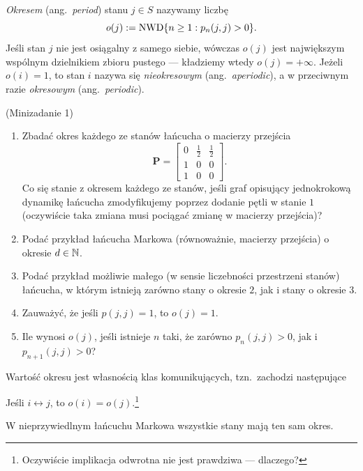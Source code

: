\documentclass[dvipsnames]{book}
\begin{document}
\begin{definicja}
\emph{Okresem} (ang.\ \emph{period}) stanu $j \in S$ nazywamy liczbę
\[
  o(j) := \mathrm{NWD}\{n \geq 1 : p_n(j,j) > 0\}.
\]
Jeśli stan $j$ nie jest osiągalny z samego siebie, wówczas $o(j)$ jest
największym wspólnym dzielnikiem zbioru pustego --- kładziemy wtedy
$o(j) = +\infty$. Jeżeli $o(i) = 1$, to stan $i$ nazywa się
\emph{nieokresowym} (ang.\ \emph{aperiodic}), a w przeciwnym razie
\emph{okresowym} (ang.\ \emph{periodic}).
\end{definicja}

\begin{zadanie}{(Minizadanie 1)}
\begin{enumerate}[label=\arabic*.]
  \item Zbadać okres każdego ze stanów łańcucha o macierzy przejścia
  \[
    \mathbf{P} =
    \begin{bmatrix}
      0 & \frac12 & \frac12 \\
      1 & 0 & 0 \\
      1 & 0 & 0
    \end{bmatrix}.
  \]
  Co się stanie z okresem każdego ze stanów, jeśli graf opisujący jednokrokową
  dynamikę łańcucha zmodyfikujemy poprzez dodanie pętli w stanie $1$
  (oczywiście taka zmiana musi pociągać zmianę w macierzy przejścia)?
  \item Podać przykład łańcucha Markowa (równoważnie, macierzy przejścia)
  o okresie $d \in \mathbb{N}$.
  \item Podać przykład możliwie małego (w sensie liczebności przestrzeni stanów)
  łańcucha, w którym istnieją zarówno stany o okresie $2$, jak i stany
  o okresie $3$.
  \item Zauważyć, że jeśli $p(j,j) = 1$, to $o(j) = 1$.
  \item Ile wynosi $o(j)$, jeśli istnieje $n$ taki, że zarówno $p_n(j,j) > 0$,
  jak i $p_{n+1}(j,j) > 0$?
\end{enumerate}
\end{zadanie}

Wartość okresu jest własnością klas komunikujących, tzn.\ zachodzi następujące

\begin{stwierdzenie}
Jeśli $i \leftrightarrow j$, to $o(i) = o(j)$.\footnote{Oczywiście implikacja
odwrotna nie jest prawdziwa --- dlaczego?}
\end{stwierdzenie}

\begin{wniosek}
W nieprzywiedlnym łańcuchu Markowa wszystkie stany mają ten sam okres.
\end{wniosek}
\end{document}
